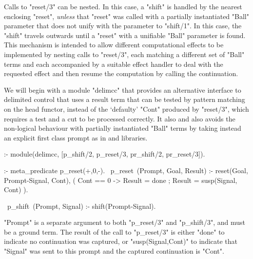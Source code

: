 Calls to "reset/3" can be nested.  In this case, a "shift" is handled by the nearest
enclosing "reset", \emph{unless} that "reset" was called with a partially instantiated "Ball" parameter
that does not unify with the parameter to "shift/1". In this case, the "shift" travels outwards
until a "reset" with a unifiable "Ball" parameter is found. This mechanism is intended to allow different
computational effects to be implemented by nesting calls to "reset/3", each matching a different set of
"Ball" terms and each accompanied by a suitable effect handler to deal with the requested effect and then 
resume the computation by calling the continuation.

We will begin with a module "delimcc" that provides an alternative interface to delimited control that
uses a result term that can be tested by pattern matching on the head functor, instead of the `defaulty' 
"Cont" produced by "reset/3", which requires a test and a cut to be processed correctly.
It also 
and also avoids the non-logical behaviour with partially instantiated "Ball" terms by taking instead
an explicit first class prompt
as in  and  libraries. 
\begin{prolog-framed}[name=delimcc]
  :- module(delimcc, [p_shift/2, p_reset/3, pr_shift/2, pr_reset/3]).

  :- meta_predicate p_reset(+,0,-).
  ~p_reset~(Prompt, Goal, Result) :-
    reset(Goal, Prompt-Signal, Cont),
    ( Cont == 0 -> Result = done
    ; Result = susp(Signal, Cont)
    ).

  ~p_shift~(Prompt, Signal) :- shift(Prompt-Signal).
\end{prolog-framed}
"Prompt" is a separate argument to both "p_reset/3" and "p_shift/3", and must be a
ground term. The result of the call to "p_reset/3" is either "done" to indicate no continuation
was captured, or "susp(Signal,Cont)" to indicate that "Signal" was sent to this prompt and
the captured continuation is "Cont".

